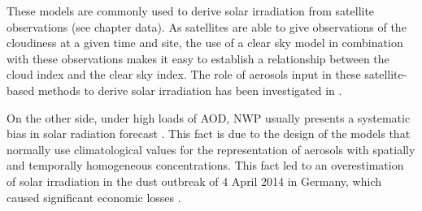 These models are commonly used to derive solar irradiation from satellite observations (see chapter data). As satellites are able to give observations of the cloudiness at a given time and site, the use of a clear sky model in combination with these observations makes it easy to establish a relationship between the cloud index and the clear sky index. The role of aerosols input in these satellite-based methods to derive solar irradiation has been investigated in \cite*{Polo2014}. 

On the other side, under high loads of AOD, NWP usually presents a systematic bias in solar radiation forecast \cite*{Rieger2017}. This fact is due to the design of the models that normally use climatological values for the representation of aerosols with spatially and temporally homogeneous concentrations. This fact led to an overestimation of solar irradiation in the dust outbreak of 4 April 2014 in Germany, which caused significant economic losses \cite{Rieger2017}.





